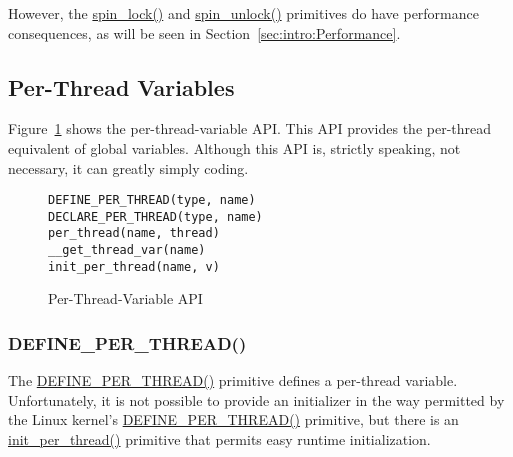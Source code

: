 However, the \url{spin_lock()} and \url{spin_unlock()} primitives
do have performance consequences, as will be seen in
Section~\ref{sec:intro:Performance}.

\subsection{Per-Thread Variables}
\label{sec:intro:Per-Thread Variables}

Figure~\ref{fig:intro:Per-Thread-Variable API}
shows the per-thread-variable API.
This API provides the per-thread equivalent of global variables.
Although this API is, strictly speaking, not necessary, it can
greatly simply coding.

\begin{figure}[htbp] 
{ \scriptsize
\begin{verbatim}
DEFINE_PER_THREAD(type, name)
DECLARE_PER_THREAD(type, name)
per_thread(name, thread)
__get_thread_var(name)
init_per_thread(name, v)
\end{verbatim}
}
\caption{Per-Thread-Variable API}
\label{fig:intro:Per-Thread-Variable API}
\end{figure}

\QuickQuizEnd

\subsubsection{DEFINE\_PER\_THREAD()}

The \url{DEFINE_PER_THREAD()} primitive defines a per-thread variable.
Unfortunately, it is not possible to provide an initializer in the way
permitted by the Linux kernel's \url{DEFINE_PER_THREAD()} primitive,
but there is an \url{init_per_thread()} primitive that permits easy
runtime initialization.

